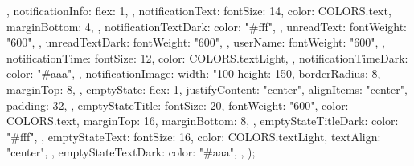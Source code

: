 {{  },
  notificationInfo: {
    flex: 1,
  },
  notificationText: {
    fontSize: 14,
    color: COLORS.text,
    marginBottom: 4,
  },
  notificationTextDark: {
    color: "#fff",
  },
  unreadText: {
    fontWeight: "600",
  },
  unreadTextDark: {
    fontWeight: "600",
  },
  userName: {
    fontWeight: "600",
  },
  notificationTime: {
    fontSize: 12,
    color: COLORS.textLight,
  },
  notificationTimeDark: {
    color: "#aaa",
  },
  notificationImage: {
    width: "100%
    height: 150,
    borderRadius: 8,
    marginTop: 8,
  },
  emptyState: {
    flex: 1,
    justifyContent: "center",
    alignItems: "center",
    padding: 32,
  },
  emptyStateTitle: {
    fontSize: 20,
    fontWeight: "600",
    color: COLORS.text,
    marginTop: 16,
    marginBottom: 8,
  },
  emptyStateTitleDark: {
    color: "#fff",
  },
  emptyStateText: {
    fontSize: 16,
    color: COLORS.textLight,
    textAlign: "center",
  },
  emptyStateTextDark: {
    color: "#aaa",
  },
});
